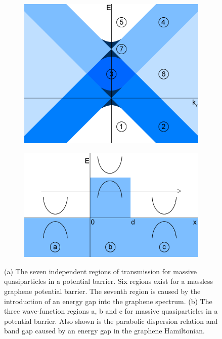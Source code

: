 \documentclass[12pt,a4paper]{report}
\begin{document}
\begin{figure}
	\begin{subfigure}{0.45\textwidth}
		\centerline{\includegraphics[scale=0.4]{images/rectangular-barrier-regions-flat}}
		\caption{}
	\end{subfigure}
	\hspace{1.2cm}
	\begin{subfigure}{0.45\textwidth}
		\centerline{\includegraphics[scale=0.45]{images/potential-constant-mass-barrier-flat}}
		\caption{}
	\end{subfigure}
	\caption{(a) The seven independent regions of transmission for massive quasiparticles in a potential barrier. Six regions exist for a massless graphene potential barrier. The seventh region is caused by the introduction of an energy gap into the graphene spectrum. (b) The three wave-function regions a, b and c for massive quasiparticles in a potential barrier. Also shown is the parabolic dispersion relation and band gap caused by an energy gap in the graphene Hamiltonian.}
	\label{rectangular-barrier-regions-flat}
\end{figure}
\end{document}
